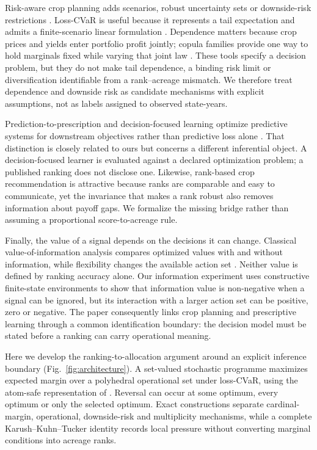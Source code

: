 Risk-aware crop planning adds scenarios, robust uncertainty sets or downside-risk restrictions \citep{randall2022robust,randall2024systematic}. Loss-CVaR is useful because it represents a tail expectation and admits a finite-scenario linear formulation \citep{rockafellar2000optimization,rockafellar2002conditional}. Dependence matters because crop prices and yields enter portfolio profit jointly; copula families provide one way to hold marginals fixed while varying that joint law \citep{demarta2005tcopula,ansari2024dependence}. These tools specify a decision problem, but they do not make tail dependence, a binding risk limit or diversification identifiable from a rank--acreage mismatch. We therefore treat dependence and downside risk as candidate mechanisms with explicit assumptions, not as labels assigned to observed state-years.

Prediction-to-prescription and decision-focused learning optimize predictive systems for downstream objectives rather than predictive loss alone \citep{bertsimas2020predictive,elmachtoub2022smart,wilder2019melding,mandi2023decision}. That distinction is closely related to ours but concerns a different inferential object. A decision-focused learner is evaluated against a declared optimization problem; a published ranking does not disclose one. Likewise, rank-based crop recommendation is attractive because ranks are comparable and easy to communicate, yet the invariance that makes a rank robust also removes information about payoff gaps. We formalize the missing bridge rather than assuming a proportional score-to-acreage rule.

Finally, the value of a signal depends on the decisions it can change. Classical value-of-information analysis compares optimized values with and without information, while flexibility changes the available action set \citep{keisler2004value,merkhofer1975value,vanmieghem1998investment}. Neither value is defined by ranking accuracy alone. Our information experiment uses constructive finite-state environments to show that information value is non-negative when a signal can be ignored, but its interaction with a larger action set can be positive, zero or negative. The paper consequently links crop planning and prescriptive learning through a common identification boundary: the decision model must be stated before a ranking can carry operational meaning.

Here we develop the ranking-to-allocation argument around an explicit inference boundary (Fig.~\ref{fig:architecture}). A set-valued stochastic programme maximizes expected margin over a polyhedral operational set under loss-CVaR, using the atom-safe representation of \citet{rockafellar2000optimization,rockafellar2002conditional}. Reversal can occur at some optimum, every optimum or only the selected optimum. Exact constructions separate cardinal-margin, operational, downside-risk and multiplicity mechanisms, while a complete Karush--Kuhn--Tucker identity records local pressure without converting marginal conditions into acreage ranks.

